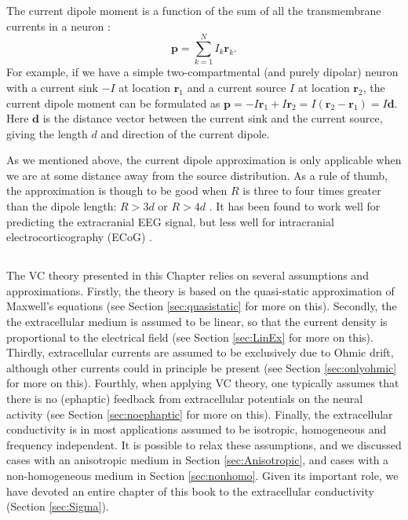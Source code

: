 The current dipole moment is a function of the sum of all the transmembrane currents in a neuron \citep{Pettersen2008, Pettersen2014, Nunez2006}: 
\begin{equation}\label{eq:dipole}
\mathbf{p} = \sum_{k=1}^N I_k \mathbf{r}_k.
\end{equation}
For example, if we have a simple two-compartmental (and purely dipolar) neuron with a current sink $-I$ at location $\mathbf{r}_1$ and a current source $I$ at location $\mathbf{r}_2$, the current dipole moment can be formulated as $\mathbf{p} = -I\mathbf{r}_1 + I\mathbf{r}_2 = I(\mathbf{r}_2 - \mathbf{r}_1) = I\mathbf{d}$. Here $\mathbf{d}$ is the distance vector between the current sink and the current source, giving the length $d$ and direction of the current dipole. 

As we mentioned above, the current dipole approximation is only applicable when we are at some distance away from the source distribution. As a rule of thumb, the approximation is though to be good when $R$ is three to four times greater than the dipole length: $R > 3d$ or $R > 4d$ \citep{Nunez2006}. It has been found to work well for predicting the extracranial EEG signal, but less well for intracranial electrocorticography (ECoG) \citep{naess2020biophysical}.


\subsection{}
\label{sec:approximations}
The VC theory presented in this Chapter relies on several assumptions and approximations. Firstly, the theory is based on the 
quasi-static approximation of Maxwell's equations (see Section \ref{sec:quasistatic} for more on this). Secondly, the the extracellular medium is assumed to be linear, so that the current density is proportional to the electrical field (see Section \ref{sec:LinEx} for more on this). Thirdly, extracellular currents are assumed to be exclusively due to Ohmic drift, although other currents could in principle be present (see Section \ref{sec:onlyohmic} for more on this). Fourthly, when applying VC theory, one typically assumes that there is no (ephaptic) feedback from extracellular potentials on the neural activity (see Section \ref{sec:noephaptic} for more on this). Finally, the extracellular conductivity is in most applications assumed to be isotropic, homogeneous and frequency independent. It is possible to relax these assumptions, and we discussed cases with an anisotropic medium in Section \ref{sec:Anisotropic}, and cases with a non-homogeneous medium in Section \ref{sec:nonhomo}. Given its important role, we have devoted an entire chapter of this book to the extracellular conductivity (Section \ref{sec:Sigma}).

